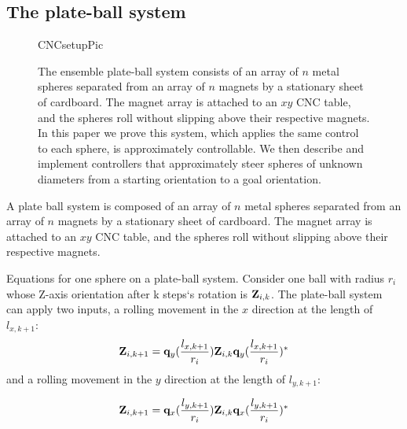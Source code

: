 \documentclass[letter paper, 10pt, conference]{ieeeconf}
\begin{document}
\subsection{The plate-ball system}

    \begin{figure}%
	\begin{center}
	\begin{overpic}[width=.9\columnwidth]{CNCsetupPic}
	\end{overpic}
	\end{center}
	\vspace{-1em}
	\caption{ \label{fig:CNCtable} The ensemble plate-ball system consists of an array of $n$ metal spheres separated from an array of $n$ magnets by a stationary sheet of cardboard.  The magnet array is attached to an $xy$ CNC table, and the spheres roll without slipping above their respective magnets.  
In this paper we prove this system, which applies the same control to each sphere, is approximately controllable.  We then describe and implement controllers that approximately steer spheres of unknown diameters from a starting orientation to a goal orientation.	
}\vspace{-1em}
\end{figure}



A plate ball system is composed of an array of $n$ metal spheres separated from an array of $n$ magnets by a stationary sheet of cardboard.  The magnet array is attached to an $xy$ CNC table, and the spheres roll without slipping above their respective magnets.



Equations for one sphere on a plate-ball system.  Consider one ball with radius $r_i$ whose Z-axis orientation after k steps`s rotation is ${\bf Z}_{i,k}$.  The plate-ball system can apply two inputs, a rolling movement in the $x$ direction at the length of $l_{x,k+1}$:
\begin{align}
{\bf Z}_{i,k+1}={\bf q}_y(\frac{l_{x,k+1}}{r_i}){\bf Z}_{i,k}{\bf q}_y(\frac{l_{x,k+1}}{r_i})^* \label{eq:PlateBallXrotation}
\end{align}
 and a rolling movement in the $y$ direction at the length of $l_{y,k+1}$:


\begin{align}
{\bf Z}_{i,k+1}={\bf q}_x(\frac{l_{y,k+1}}{r_i}){\bf Z}_{i,k}{\bf q}_x(\frac{l_{y,k+1}}{r_i})^* \label{eq:PlateBallYrotations}
\end{align}
\end{document}
